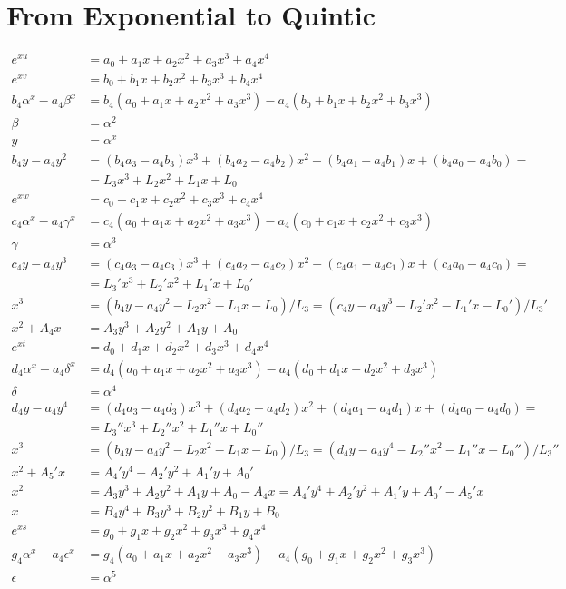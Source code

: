 \documentclass[12pt,a4paper]{article}
\begin{document}
\section{From Exponential to Quintic}

\begin{align}
e^{xu} &= a_0 + a_1 x + a_2 x^2 + a_3 x^3 + a_4 x^4 \\
e^{xv} &= b_0 + b_1 x + b_2 x^2 + b_3 x^3 + b_4 x^4 \\
b_4 \alpha^x - a_4 \beta^x &= b_4 (a_0 + a_1 x + a_2 x^2 + a_3 x^3) - a_4 (b_0 + b_1 x + b_2 x^2 + b_3 x^3) \\
\beta &= \alpha^2 \\
y &= \alpha^x \\
b_4 y - a_4 y^2 &= (b_4 a_3 - a_4 b_3) x^3 + (b_4 a_2 - a_4 b_2) x^2 + (b_4 a_1 - a_4 b_1)x + (b_4 a_0 - a_4 b_0) = \nonumber \\
&= L_3 x^3 + L_2 x^2 + L_1 x + L_0 \\
e^{xw} &= c_0 + c_1 x + c_2 x^2 + c_3 x^3 + c_4 x^4 \\
c_4 \alpha^x - a_4 \gamma^x &= c_4 (a_0 + a_1 x + a_2 x^2 + a_3 x^3) - a_4 (c_0 + c_1 x + c_2 x^2 + c_3 x^3) \\
\gamma &= \alpha^3 \\
c_4 y - a_4 y^3 &= (c_4 a_3 - a_4 c_3)x^3 + (c_4 a_2 - a_4 c_2) x^2 + (c_4 a_1 - a_4 c_1)x + (c_4 a_0 - a_4 c_0) = \nonumber \\
&= L_3' x^3 + L_2' x^2 + L_1' x + L_0' \\
x^3 &= (b_4 y - a_4 y^2 - L_2 x^2 - L_1 x - L_0)/L_3 = (c_4 y - a_4 y^3 - L_2' x^2 - L_1' x - L_0')/L_3' \\
x^2 + A_4 x &= A_3 y^3 + A_2 y^2 + A_1 y + A_0 \\
e^{xt} &= d_0 + d_1 x + d_2 x^2 + d_3 x^3 + d_4 x^4 \\
d_4 \alpha^x - a_4 \delta^x &= d_4 (a_0 + a_1 x + a_2 x^2 + a_3 x^3) - a_4 (d_0 + d_1 x + d_2 x^2 + d_3 x^3) \\
\delta &= \alpha^4 \\
d_4 y - a_4 y^4 &= (d_4 a_3 - a_4 d_3) x^3 + (d_4 a_2 - a_4 d_2) x^2 + (d_4 a_1 - a_4 d_1)x + (d_4 a_0 - a_4 d_0) = \nonumber \\
&= L_3'' x^3 + L_2'' x^2 + L_1'' x + L_0'' \\
x^3 &= (b_4 y - a_4 y^2 - L_2 x^2 - L_1 x - L_0)/L_3 = (d_4 y - a_4 y^4 - L_2'' x^2 - L_1'' x - L_0'')/L_3'' \\
x^2 + A_5' x &= A_4' y^4 + A_2' y^2 + A_1' y + A_0' \\
x^2 &= A_3 y^3 + A_2 y^2 + A_1 y + A_0 - A_4 x = A_4' y^4 + A_2' y^2 + A_1' y + A_0' - A_5' x \\
x &= B_4 y^4 + B_3 y^3 + B_2 y^2 + B_1 y + B_0 \\
e^{xs} &= g_0 + g_1 x + g_2 x^2 + g_3 x^3 + g_4 x^4 \\
g_4 \alpha^x - a_4 \epsilon^x &= g_4 (a_0 + a_1 x + a_2 x^2 + a_3 x^3) - a_4 (g_0 + g_1 x + g_2 x^2 + g_3 x^3) \\
\epsilon &= \alpha^5
\end{align}
\end{document}
